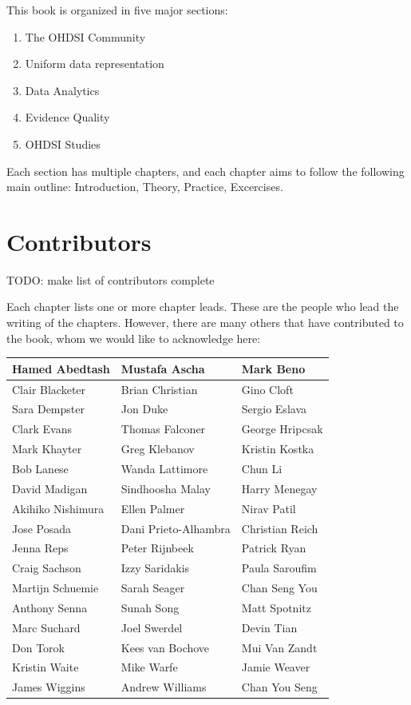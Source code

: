 \documentclass[11pt]{book}
\providecommand{\tightlist}{%
  \setlength{\itemsep}{0pt}\setlength{\parskip}{0pt}}
\theoremstyle{definition}
\theoremstyle{definition}
\theoremstyle{definition}
\theoremstyle{remark}
\begin{document}
This book is organized in five major sections:

\begin{enumerate}
\def\labelenumi{\Roman{enumi})}
\tightlist
\item
  The OHDSI Community
\item
  Uniform data representation
\item
  Data Analytics
\item
  Evidence Quality
\item
  OHDSI Studies
\end{enumerate}

Each section has multiple chapters, and each chapter aims to follow the following main outline: Introduction, Theory, Practice, Excercises.

\hypertarget{contributors}{%
\section*{Contributors}\label{contributors}}

TODO: make list of contributors complete

Each chapter lists one or more chapter leads. These are the people who lead the writing of the chapters. However, there are many others that have contributed to the book, whom we would like to acknowledge here:

\begin{tabular}{l|l|l}
\hline
Hamed Abedtash & Mustafa Ascha & Mark Beno\\
\hline
Clair Blacketer & Brian Christian & Gino Cloft\\
\hline
Sara Dempster & Jon Duke & Sergio Eslava\\
\hline
Clark Evans & Thomas Falconer & George Hripcsak\\
\hline
Mark Khayter & Greg Klebanov & Kristin Kostka\\
\hline
Bob Lanese & Wanda Lattimore & Chun Li\\
\hline
David Madigan & Sindhoosha  Malay & Harry Menegay\\
\hline
Akihiko Nishimura & Ellen Palmer & Nirav Patil\\
\hline
Jose Posada & Dani Prieto-Alhambra & Christian Reich\\
\hline
Jenna Reps & Peter Rijnbeek & Patrick Ryan\\
\hline
Craig Sachson & Izzy Saridakis & Paula Saroufim\\
\hline
Martijn Schuemie & Sarah Seager & Chan Seng You\\
\hline
Anthony Senna & Sunah Song & Matt Spotnitz\\
\hline
Marc Suchard & Joel Swerdel & Devin Tian\\
\hline
Don Torok & Kees van Bochove & Mui Van Zandt\\
\hline
Kristin Waite & Mike Warfe & Jamie Weaver\\
\hline
James Wiggins & Andrew Williams & Chan You Seng\\
\hline
\end{tabular}
\end{document}
